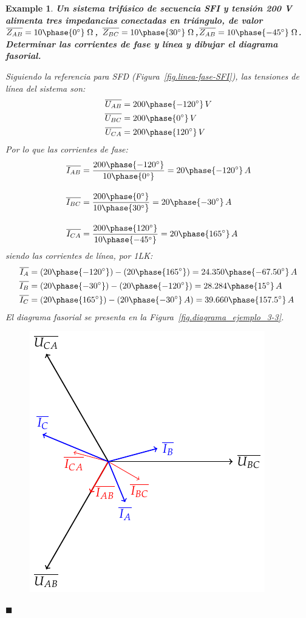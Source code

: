 \documentclass[11pt]{book} %
\numberwithin{dummy}{section}
\theoremstyle{ocrenumbox}
\theoremstyle{blacknumex}
\newtheorem{exampleT}{Example}[chapter]
\theoremstyle{blacknumbox}
\theoremstyle{ocrenum}
\newenvironment{example}{\begin{exampleT}}{\hfill{\tiny\ensuremath{\blacksquare}}\end{exampleT}}
\begin{document}
	\vspace{4mm}
	\begin{example}\label{ej.3-3}
	    \textbf{Un sistema trifásico de secuencia SFI y tensión 200 V alimenta tres impedancias conectadas en triángulo, de valor $\overline{Z_{AB}}=10\phase{0^\circ}\;\Omega$, $\overline{Z_{BC}}=10\phase{30^\circ}\;\Omega$,$\overline{Z_{AB}}=10\phase{-45^\circ}\;\Omega$. Determinar las corrientes de fase y línea y dibujar el diagrama fasorial.}
	    
	    Siguiendo la referencia para SFD (Figura~\ref{fig.linea-fase-SFI}), las tensiones de línea del sistema son:
	    \begin{align*}
	        \overline{U_{AB}}&=200\phase{-120^\circ}\,V\\
	        \overline{U_{BC}}&=200\phase{0^\circ}\,V\\
	        \overline{U_{CA}}&=200\phase{120^\circ}\,V
	    \end{align*}
	    Por lo que las corrientes de fase:
	    \begin{align*}
	        \overline{I_{AB}} &= \frac{200\phase{-120^\circ}}{10\phase{0^\circ}} =20\phase{-120^\circ} \,A \\[10pt]
          \overline{I_{BC}} &= \frac{200\phase{0^\circ}}{10\phase{30^\circ}} = 20\phase{-30^\circ} \,A\\[10pt]
          \overline{I_{CA}} &=\frac{200\phase{120^\circ}}{10\phase{-45^\circ}} = 20\phase{165^\circ} \,A
	    \end{align*}
	    siendo las corrientes de línea, por 1LK:
	    \begin{align*}
	     \overline{I_A}&=(20\phase{-120^\circ})-(20\phase{165^\circ})=24.350\phase{-67.50^\circ}\,A\\	        \overline{I_B}&=(20\phase{-30^\circ})-(20\phase{-120^\circ})=28.284\phase{15^\circ}\,A\\
	    \overline{I_C}&=(20\phase{165^\circ})-(20\phase{-30^\circ} \,A)=39.660\phase{157.5^\circ}\,A
	    \end{align*}
	    El diagrama fasorial se presenta en la Figura~\ref{fig.diagrama_ejemplo_3-3}. 
	    \begin{figure}
	        \centering
	        \includegraphics{../figs/diagrama_3_3.pdf}

\end{figure}
\end{example}
\end{document}
